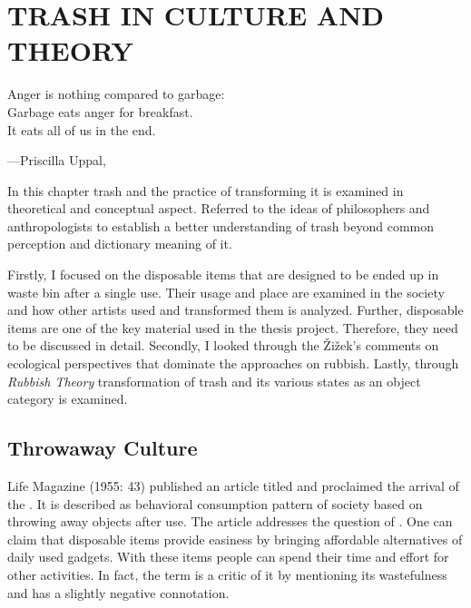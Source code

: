 \chapter{TRASH IN CULTURE AND THEORY}



\begin{singlespace}
\epigraph{Anger is nothing compared to garbage:\\Garbage eats anger for breakfast.\\It eats all of us in the end.}{\hfill---Priscilla Uppal, }
\end{singlespace}



In this chapter trash and the practice of transforming it is examined in theoretical and conceptual aspect. Referred to the ideas of philosophers and anthropologists to establish a better understanding of trash beyond common perception and dictionary meaning of it.

Firstly, I focused on the disposable items that are designed to be ended up in waste bin after a single use. Their usage and place are examined in the society and how other artists used and transformed them is analyzed. Further, disposable items are one of the key material used in the thesis project. Therefore, they need to be discussed in detail. Secondly, I looked through the Žižek’s comments on ecological perspectives that dominate the approaches on rubbish. Lastly, through \textit{Rubbish Theory} transformation of trash and its various states as an object category is examined.



\section{Throwaway Culture}

Life Magazine (1955: 43) published an article titled  and proclaimed the arrival of the . It is described as behavioral consumption pattern of society based on throwing away objects after use. The article addresses the question of  \citep{tully2014throw}. One can claim that disposable items provide easiness by bringing affordable alternatives of daily used gadgets. With these items people can spend their time and effort for other activities. In fact, the term  is a critic of it by mentioning its wastefulness and has a slightly negative connotation.

